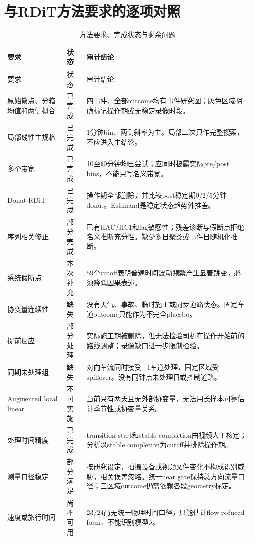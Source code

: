 \documentclass[11pt,a4paper]{ctexart}
\newcommand{\risk}[1]{\textcolor{red!65!black}{#1}}
\newcommand{\caution}[1]{\textcolor{orange!65!black}{#1}}
\newcommand{\ok}[1]{\textcolor{blue!65!black}{#1}}
\begin{document}
\section{与RDiT方法要求的逐项对照}

\begin{longtable}{p{}p{}p{}}
\caption{方法要求、完成状态与剩余问题}\label{tab:audit_checklist}\\
\toprule
要求 & 状态 & 审计结论 \\
\midrule
\endfirsthead
\toprule
要求 & 状态 & 审计结论 \\
\midrule
\endhead
原始散点、分箱均值和两侧拟合 & \ok{已完成} & 四事件、全部outcome均有事件研究图；灰色区域明确标记操作期或无稳定录像时段。\\
局部线性主规格 & \ok{已完成} & 1分钟bin、两侧斜率为主。局部二次只作完整搜索，不应进入主结论。\\
多个带宽 & \ok{已完成} & 10至60分钟均已尝试；应同时披露实际pre/post bins，不能只写名义带宽。\\
Donut RDiT & \ok{已完成} & 操作期全部删除，并比较post稳定期0/2/5分钟donut。Estimand是稳定状态趋势外推差。\\
序列相关修正 & \caution{部分完成} & 已有HAC/HC1和lag敏感性；残差诊断与假断点拒绝名义推断充分性。缺少多日聚类或事件日随机化推断。\\
系统假断点 & \ok{本次补充} & 59个cutoff表明普通时间波动频繁产生显著跳变，必须降低因果表述。\\
协变量连续性 & \risk{缺失} & 没有天气、事故、临时施工或同步道路状态。固定车道outcome只能作为不完全placebo。\\
提前反应 & \caution{部分处理} & 实际施工期被删除，但无法检验司机在操作开始前的路线调整；录像缺口进一步限制检验。\\
同期未处理组 & \risk{缺失} & 对向车流同时接受$-1$车道处理，固定区域受spillover。没有同钟点未处理日或控制道路。\\
Augmented local linear & \risk{不可实施} & 当前只有两天且无外部协变量，无法用长样本可靠估计季节性或协变量关系。\\
处理时间精度 & \ok{已完成} & transition start和stable completion由视频人工核定；分析以stable completion为cutoff并排除操作期。\\
测量口径稳定 & \caution{部分满足} & 按研究设定，拍摄设备或视频文件变化不构成识别威胁，相关误差忽略。统一near gate保持总方向流量口径；三区域outcome仍需依赖各段geometry标定。\\
速度或旅行时间 & \risk{尚不可用} & 23/24尚无统一物理时间口径，只能估计flow reduced form，不能识别模型$\lambda$。\\
\bottomrule
\end{longtable}
\end{document}
